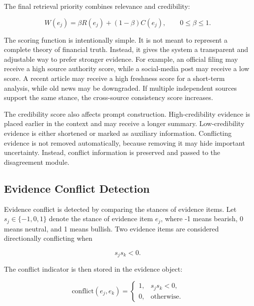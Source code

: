 \documentclass[14pt,a4paper]{extarticle}
\begin{document}
The final retrieval priority combines relevance and credibility:

\begin{equation}
W(e_j)=\beta R(e_j)+(1-\beta)C(e_j),
\qquad 0\leq\beta\leq1.
\label{eq:retrieval-weight}
\end{equation}

The scoring function is intentionally simple. It is not meant to represent a complete theory of financial truth. Instead, it gives the system a transparent and adjustable way to prefer stronger evidence. For example, an official filing may receive a high source authority score, while a social-media post may receive a low score. A recent article may receive a high freshness score for a short-term analysis, while old news may be downgraded. If multiple independent sources support the same stance, the cross-source consistency score increases.

The credibility score also affects prompt construction. High-credibility evidence is placed earlier in the context and may receive a longer summary. Low-credibility evidence is either shortened or marked as auxiliary information. Conflicting evidence is not removed automatically, because removing it may hide important uncertainty. Instead, conflict information is preserved and passed to the disagreement module.

\subsection{Evidence Conflict Detection}

Evidence conflict is detected by comparing the stances of evidence items. Let $s_j \in \{-1,0,1\}$ denote the stance of evidence item $e_j$, where -1 means bearish, 0 means neutral, and 1 means bullish. Two evidence items are considered directionally conflicting when

\begin{equation}
s_j s_k < 0 .
\label{eq:evidence-conflict}
\end{equation}

The conflict indicator is then stored in the evidence object:

\begin{equation}
\mathrm{conflict}(e_j,e_k)=
\begin{cases}
1, & s_j s_k < 0,\\
0, & \text{otherwise}.
\end{cases}
\label{eq:conflict-indicator}
\end{equation}
\end{document}
